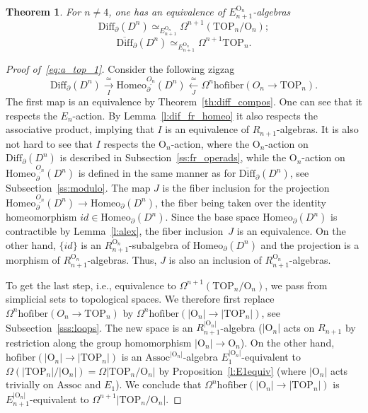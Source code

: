 \documentclass[10pt,a4paper]{amsart}
\newtheorem{theorem}{Theorem}
\newcommand{\Assoc}{\mathrm{Assoc}}
\newcommand{\Dbarn}{\overline{\mathrm{Diff}}_\partial(D^n)}
\newcommand{\Diffn}{\mathrm{Diff}_\partial(D^n)}
\newcommand{\Homeo}{\mathrm{Homeo}}
\newcommand{\OO}{\mathrm{O}}
\newcommand{\TOP}{\mathrm{TOP}}
\newcommand{\hofiber}{\mathrm{hofiber}}
\begin{document}
\begin{theorem}\label{th:a_top}
For $n\neq 4$, one has an equivalence of $E_{n+1}^{\OO_n}$-algebras
\begin{equation}\label{eq:a_top_1}
\Diffn\simeq_{E_{n+1}^{\OO_n}}\Omega^{n+1}\left(\TOP_n/\OO_n\right);
\end{equation}
\begin{equation}\label{eq:a_top_2}
\Dbarn\simeq_{E_{n+1}^{\OO_n}}\Omega^{n+1}\TOP_n.
\end{equation}
\end{theorem}

\begin{proof}[Proof of~\eqref{eq:a_top_1}]
Consider the following zigzag
\[
\Diffn\xrightarrow[I]{\,\simeq\,}\Homeo_\partial^{\underline{O_n}}(D^n)\xleftarrow[J]{\,\simeq\,}\Omega^n\hofiber(O_n\to\TOP_n).
\]
The first map is an equivalence by Theorem~\ref{th:diff_compos}. One can see that it respects the $E_n$-action. By Lemma~\ref{l:dif_fr_homeo} it  also respects the associative product, implying that $I$ is an equivalence of 
$R_{n+1}$-algebras. It is also not hard to see that $I$ respects the $\OO_{n}$-action, where the $\OO_{n}$-action on $\Diffn$ is described in Subsection~\ref{ss:fr_operads}, while the $\OO_n$-action on 
$\Homeo_\partial^{\underline{O_n}}(D^n)$ is defined in the same manner as for $\Dbarn$,
see Subsection~\ref{ss:modulo}. The map $J$ is the fiber inclusion  for the projection
$\Homeo_\partial^{\underline{O_n}}(D^n)\to \Homeo_\partial(D^n)$, the fiber 
 being taken over the
identity homeomorphism $id\in \Homeo_\partial(D^n)$. Since the base space $\Homeo_\partial(D^n)$ is contractible by Lemma~\ref{l:alex}, the fiber inclusion~$J$ is an equivalence. On the other hand, $\{id\}$
is an $R_{n+1}^{\OO_n}$-subalgebra of $\Homeo_\partial(D^n)$ and the projection is a morphism
of $R_{n+1}^{\OO_n}$-algebras. Thus, $J$ is also an inclusion of $R_{n+1}^{\OO_n}$-algebras.

To get the last step, i.e., equivalence to $\Omega^{n+1}\left(\TOP_n/ \OO_n\right)$, we pass from
simplicial sets to topological spaces. %
 We therefore first replace $\Omega^n\hofiber\left(O_n\to\TOP_n\right)$
by $\Omega^n\hofiber\left(|\OO_n|\to|\TOP_n|\right)$, see Subsection~\ref{sss:loops}. The new space
is an $R_{n+1}^{|\OO_n|}$-algebra ($|\OO_n|$ acts on $R_{n+1}$ by restriction along the group homomorphism $|\OO_n|\to \OO_n$). On the other hand, $\hofiber\left(|\OO_n|\to|\TOP_n|\right)$ is an $\Assoc^{|\OO_n|}$-algebra
$E_1^{|\OO_n|}$-equivalent to 
$\Omega\left(|\TOP_n|/|\OO_n|\right)=\Omega\left|\TOP_n/\OO_n\right|$ by Proposition~\ref{l:E1equiv} (where $|\OO_n|$ acts trivially on $\Assoc$ and $E_1$). We conclude that 
 $\Omega^n\hofiber\left(|\OO_n|\to|\TOP_n|\right)$ is $E_{n+1}^{|\OO_n|}$-equivalent to 
$\Omega^{n+1}\left|\TOP_n/\OO_n\right|$.
\end{proof}
\end{document}
